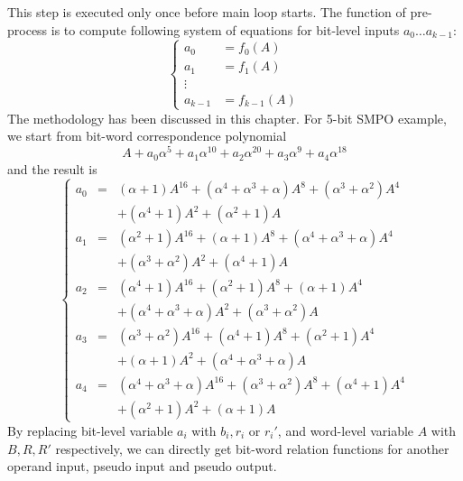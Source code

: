 This step is executed only once before main loop starts. The function of pre-process is to compute following system
of equations for bit-level inputs $a_0 \dots a_{k-1}$:
\begin{displaymath}
\left\{
  \begin{array}{ll}
  a_0 & = f_0(A)\\
  a_1 & = f_1(A)\\
  \vdots & \ \\
  a_{k-1} & = f_{k-1}(A)
  \end{array} \right.
\end{displaymath}
The methodology has been discussed in this chapter. For 5-bit SMPO example, we start from bit-word correspondence polynomial
\begin{displaymath}
A + a_0\alpha^5+a_1\alpha^{10}+a_2\alpha^{20}+a_3\alpha^9+a_4\alpha^{18}
\end{displaymath}
and the result is
\begin{displaymath}
\left\{
  \begin{array}{lcl}
  a_0 & = & (\alpha+1)A^{16}+(\alpha^4+\alpha^3+\alpha)A^8+(\alpha^3+\alpha^2)A^4\\&&+(\alpha^4+1)A^2+(\alpha^2+1)A\\
  a_1 & = & (\alpha^2+1)A^{16}+(\alpha+1)A^8+(\alpha^4+\alpha^3+\alpha)A^4\\&&+(\alpha^3+\alpha^2)A^2+(\alpha^4+1)A\\
  a_2 & = & (\alpha^4+1)A^{16}+(\alpha^2+1)A^8+(\alpha+1)A^4\\&&+(\alpha^4+\alpha^3+\alpha)A^2+(\alpha^3+\alpha^2)A\\
  a_3 & = & (\alpha^3+\alpha^2)A^{16}+(\alpha^4+1)A^8+(\alpha^2+1)A^4\\&&+(\alpha+1)A^2+(\alpha^4+\alpha^3+\alpha)A\\
  a_4 & = & (\alpha^4+\alpha^3+\alpha)A^{16}+(\alpha^3+\alpha^2)A^8+(\alpha^4+1)A^4\\&&+(\alpha^2+1)A^2+(\alpha+1)A
  \end{array} \right.
\end{displaymath}
By replacing bit-level variable $a_i$ with $b_i, r_i$ or $r_i'$, and word-level variable $A$ with $B, R, R'$ respectively,
we can directly get bit-word relation functions for another operand input, pseudo input and pseudo output.


